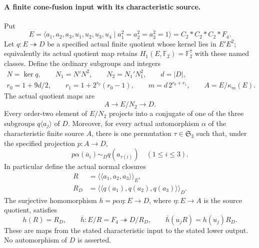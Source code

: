 \paragraph{A finite cone-fusion input with its characteristic source.}
Put
\[
 E=\langle a_1,a_2,a_3,u_1,u_2,u_3,u_4\mid
                         a_1^2=a_2^2=a_3^2=1\rangle
            =C_2*C_2*C_2*F_4.
                                                               \tag{CONE.1}
\]
Let $q:E\twoheadrightarrow D$ be a specified actual finite quotient
whose kernel lies in $E'E^2$; equivalently its actual quotient map
retains $H_1(E,\mathbb F_2)=\mathbb F_2^7$ with these named classes.
Define the ordinary subgroups and integers
\[
 \begin{gathered}
 N=\ker q,\qquad N_1=N'N^2,\qquad N_2=N_1'N_1^2,\qquad d=|D|,\\
 r_0=1+9d/2,\qquad r_1=1+2^{r_0}(r_0-1),\qquad
 m=d\,2^{r_0+r_1},\qquad A=E/\kappa_m(E).
 \end{gathered}                                                   \tag{CONE.2}
\]
The actual quotient maps are
\[
                  A\longrightarrow E/N_2\longrightarrow D.
                                                               \tag{CONE.3}
\]
Every order-two element of $E/N_2$ projects into a conjugate of one
of the three subgroups $q\langle a_j\rangle$ of $D$.
Moreover, for every actual automorphism $\alpha$ of the characteristic
finite source $A$, there is one permutation $\tau\in\mathfrak S_3$
such that, under the specified projection $p:A\to D$,
\[
                   p\alpha(\overline a_i)
                         \sim_D q(a_{\tau(i)})
                                      \quad(1\leq i\leq3).
                                                               \tag{CONE.4}
\]
In particular define the actual normal closures
\[
 \begin{aligned}
 R&=\langle\!\langle a_1,a_2,a_3\rangle\!\rangle_E,\\
 R_D&=\langle\!\langle q(a_1),q(a_2),q(a_3)\rangle\!\rangle_D.
 \end{aligned}
\]
The surjective homomorphism $h=p\alpha\eta:E\to D$, where
$\eta:E\to A$ is the source quotient, satisfies
\[
                    h(R)=R_D,
 \qquad
 \overline h:E/R=F_4\twoheadrightarrow D/R_D,
 \qquad \overline h(u_jR)=h(u_j)R_D.
                                                               \tag{CONE.5}
\]
These are maps from the stated characteristic input to the stated
lower output.  No automorphism of $D$ is asserted.

